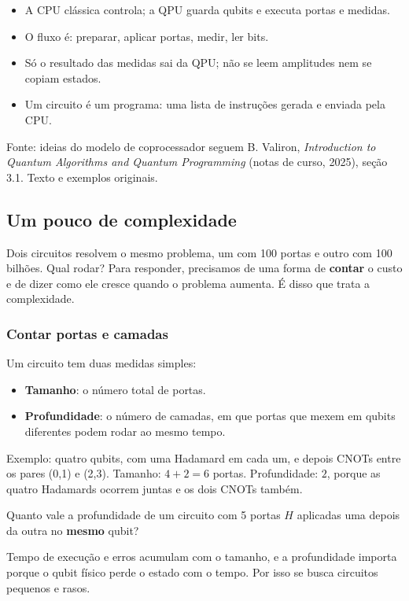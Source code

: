 \begin{itemize}
\tightlist
\item
  A CPU clássica controla; a QPU guarda qubits e executa portas e medidas.
\item
  O fluxo é: preparar, aplicar portas, medir, ler bits.
\item
  Só o resultado das medidas sai da QPU; não se leem amplitudes nem se copiam estados.
\item
  Um circuito é um programa: uma lista de instruções gerada e enviada pela CPU.
\end{itemize}

Fonte: ideias do modelo de coprocessador seguem B. Valiron, \emph{Introduction to Quantum Algorithms and Quantum Programming} (notas de curso, 2025), seção 3.1. Texto e exemplos originais.

\subsection{Um pouco de complexidade}
Dois circuitos resolvem o mesmo problema, um com 100 portas e outro com 100 bilhões. Qual rodar? Para responder, precisamos de uma forma de \textbf{contar} o custo e de dizer como ele cresce quando o problema aumenta. É disso que trata a complexidade.

\subsubsection{Contar portas e camadas}\label{contar-portas-e-camadas}

Um circuito tem duas medidas simples:

\begin{itemize}
\tightlist
\item
  \textbf{Tamanho}: o número total de portas.
\item
  \textbf{Profundidade}: o número de camadas, em que portas que mexem em qubits diferentes podem rodar ao mesmo tempo.
\end{itemize}

Exemplo: quatro qubits, com uma Hadamard em cada um, e depois CNOTs entre os pares (0,1) e (2,3). Tamanho: \(4+2 = 6\) portas. Profundidade: \(2\), porque as quatro Hadamards ocorrem juntas e os dois CNOTs também.

Quanto vale a profundidade de um circuito com 5 portas \(H\) aplicadas uma depois da outra no \textbf{mesmo} qubit?

Tempo de execução e erros acumulam com o tamanho, e a profundidade importa porque o qubit físico perde o estado com o tempo. Por isso se busca circuitos pequenos e rasos.

